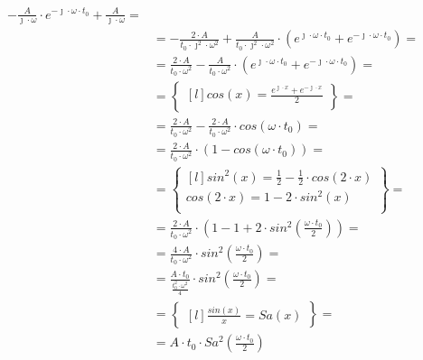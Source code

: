 \begin{task}
\begin{align*}
- \frac{A}{\jmath \cdot \omega} \cdot e^{ -\jmath \cdot \omega \cdot t_{0}} + \frac{A}{\jmath \cdot \omega}=\\
&=- \frac{2 \cdot A}{t_{0} \cdot \jmath^{2} \cdot \omega^{2}} + \frac{A}{t_{0} \cdot \jmath^{2} \cdot \omega^{2}}  \cdot \left(e^{ \jmath \cdot \omega \cdot t_{0}}+e^{ -\jmath \cdot \omega \cdot t_{0}} \right)=\\ %
&= \frac{2 \cdot A}{t_{0} \cdot \omega^{2}} - \frac{A}{t_{0} \cdot \omega^{2}} \cdot \left(e^{ \jmath \cdot \omega \cdot t_{0}}+e^{ -\jmath \cdot \omega \cdot t_{0}} \right)=\\%
&=\begin{Bmatrix*}[l]%
cos(x)=\frac{e^{\jmath \cdot x} + e^{-\jmath \cdot x}}{2}\\
\end{Bmatrix*}=\\
&= \frac{2 \cdot A}{t_{0} \cdot \omega^{2}} - \frac{2 \cdot A}{t_{0} \cdot \omega^{2}} \cdot cos(\omega \cdot t_{0})=\\%
&= \frac{2 \cdot A}{t_{0} \cdot \omega^{2}} \cdot (1 - cos(\omega \cdot t_{0}))=\\%
&=\begin{Bmatrix*}[l]%
sin^{2}(x)=\frac{1}{2}-\frac{1}{2}\cdot cos(2 \cdot x)\\
cos(2 \cdot x)= 1-2\cdot sin^{2}(x)\\
\end{Bmatrix*}=\\
&= \frac{2 \cdot A}{t_{0} \cdot \omega^{2}} \cdot (1 - 1 + 2\cdot sin^{2}(\frac{\omega \cdot t_{0}}{2}))=\\%
&= \frac{4 \cdot A}{t_{0} \cdot \omega^{2}} \cdot sin^{2}(\frac{\omega \cdot t_{0}}{2})=\\%
&= \frac{A \cdot t_{0}}{\frac{t_{0}^{2} \cdot \omega^{2}}{4}} \cdot sin^{2}(\frac{\omega \cdot t_{0}}{2})=\\%
&=\begin{Bmatrix*}[l]%
\frac{sin(x)}{x}=Sa(x)
\end{Bmatrix*}=\\
&= A \cdot t_{0} \cdot Sa^{2}(\frac{\omega \cdot t_{0}}{2})%
\end{align*}


\end{task}
